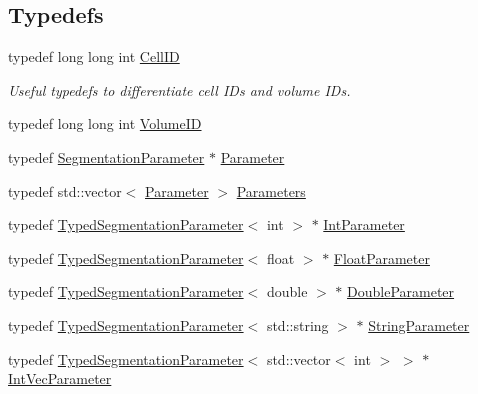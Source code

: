 \subsection*{Typedefs}
\begin{DoxyCompactItemize}
\item 
typedef long long int \hyperlink{namespace_d_d4hep_1_1_d_d_segmentation_ac7af071d85cb48820914434a07e21ba1}{Cell\+ID}
\begin{DoxyCompactList}\small\item\em Useful typedefs to differentiate cell I\+Ds and volume I\+Ds. \end{DoxyCompactList}\item 
typedef long long int \hyperlink{namespace_d_d4hep_1_1_d_d_segmentation_a61a6833a18d1800bdef176595f83e3ba}{Volume\+ID}
\item 
typedef \hyperlink{class_d_d4hep_1_1_d_d_segmentation_1_1_segmentation_parameter}{Segmentation\+Parameter} $\ast$ \hyperlink{namespace_d_d4hep_1_1_d_d_segmentation_af6c6bad2a745d807a0ed00506fb34ccf}{Parameter}
\item 
typedef std\+::vector$<$ \hyperlink{namespace_d_d4hep_1_1_d_d_segmentation_af6c6bad2a745d807a0ed00506fb34ccf}{Parameter} $>$ \hyperlink{namespace_d_d4hep_1_1_d_d_segmentation_af38026430ca0e1ef64acdfc898f5dd3d}{Parameters}
\item 
typedef \hyperlink{class_d_d4hep_1_1_d_d_segmentation_1_1_typed_segmentation_parameter}{Typed\+Segmentation\+Parameter}$<$ int $>$ $\ast$ \hyperlink{namespace_d_d4hep_1_1_d_d_segmentation_a40b9037137fce6e98a4a1b3e74078679}{Int\+Parameter}
\item 
typedef \hyperlink{class_d_d4hep_1_1_d_d_segmentation_1_1_typed_segmentation_parameter}{Typed\+Segmentation\+Parameter}$<$ float $>$ $\ast$ \hyperlink{namespace_d_d4hep_1_1_d_d_segmentation_a1f6134fdcd18b625bc940d064598090a}{Float\+Parameter}
\item 
typedef \hyperlink{class_d_d4hep_1_1_d_d_segmentation_1_1_typed_segmentation_parameter}{Typed\+Segmentation\+Parameter}$<$ double $>$ $\ast$ \hyperlink{namespace_d_d4hep_1_1_d_d_segmentation_a58fbf7ecc413a4ffb59ab7b49d1af947}{Double\+Parameter}
\item 
typedef \hyperlink{class_d_d4hep_1_1_d_d_segmentation_1_1_typed_segmentation_parameter}{Typed\+Segmentation\+Parameter}$<$ std\+::string $>$ $\ast$ \hyperlink{namespace_d_d4hep_1_1_d_d_segmentation_a43a80cf70a60b3c858aca4fa463d8f7c}{String\+Parameter}
\item 
typedef \hyperlink{class_d_d4hep_1_1_d_d_segmentation_1_1_typed_segmentation_parameter}{Typed\+Segmentation\+Parameter}$<$ std\+::vector$<$ int $>$ $>$ $\ast$ \hyperlink{namespace_d_d4hep_1_1_d_d_segmentation_a999961b3c725feedb2456dd0f046f1e3}{Int\+Vec\+Parameter}

\end{DoxyCompactItemize}
